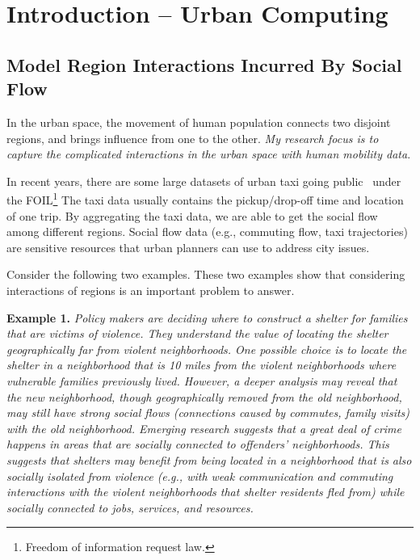 \chapter{Introduction -- Urban Computing} \label{chapter1:introduction}





\section{Model Region Interactions Incurred By Social Flow}


In the urban space, the movement of human population connects two disjoint regions, and brings influence from one to the other. \emph{My research focus is to capture the complicated interactions in the urban space with human mobility data}. 

In recent years, there are some large datasets of urban taxi going public~\cite{} under the FOIL\footnote{Freedom of information request law.}  The taxi data usually contains the pickup/drop-off time and location of one trip. By aggregating the taxi data, we are able to get the social flow among different regions.
Social flow data (e.g., commuting flow, taxi trajectories) are sensitive resources that urban planners can use to address city issues. 


Consider the following two examples. These two examples show that considering interactions of regions is an important problem to answer.


\textbf{Example 1.} \emph{Policy makers are deciding where to construct a shelter for families that are victims of violence. They understand the value of locating the shelter geographically far from violent neighborhoods. One possible choice is to locate the shelter in a neighborhood that is 10 miles from the violent neighborhoods where vulnerable families previously lived. However, a deeper analysis may reveal that the new neighborhood, though geographically removed from the old neighborhood, may still have strong social flows (connections caused by commutes, family visits) with the old neighborhood. Emerging research suggests that a great deal of crime happens in areas that are socially connected to offenders' neighborhoods. This suggests that shelters may benefit from being located in a neighborhood that is also socially isolated from violence (e.g., with weak communication and commuting interactions with the violent neighborhoods that shelter residents fled from) while socially connected to jobs, services, and resources.}


